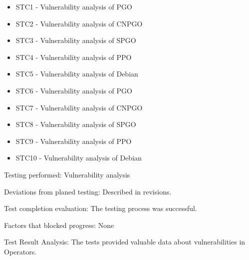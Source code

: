 \begin{itemize}
    \item STC1 - Vulnerability analysis of PGO
    \item STC2 - Vulnerability analysis of CNPGO
    \item STC3 - Vulnerability analysis of SPGO
    \item STC4 - Vulnerability analysis of PPO
    \item STC5 - Vulnerability analysis of Debian
    \item STC6 - Vulnerability analysis of PGO
    \item STC7 - Vulnerability analysis of CNPGO
    \item STC8 - Vulnerability analysis of SPGO
    \item STC9 - Vulnerability analysis of PPO
    \item STC10 - Vulnerability analysis of Debian
\end{itemize}

Testing performed: Vulnerability analysis

Deviations from planed testing: Described in revisions.

Test completion evaluation: The testing process was successful.

Factors that blocked progress: None

Test Result Analysis: The tests provided valuable data about vulnerabilities in Operators.


